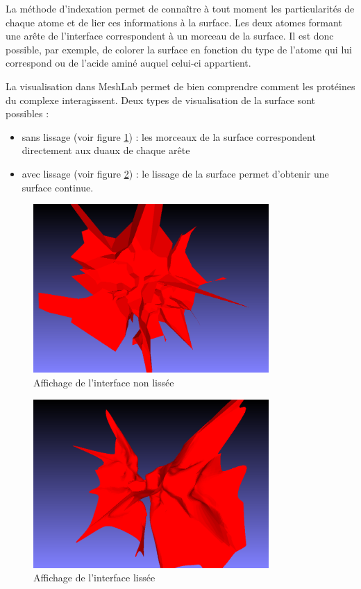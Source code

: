 La méthode d'indexation permet de connaître à tout moment les particularités de chaque
atome et de lier ces informations à la surface. Les deux atomes formant une arête
de l'interface correspondent à un morceau de la surface. Il est donc possible, par exemple,
de colorer la surface en fonction du type de l'atome qui lui correspond ou de l'acide aminé
auquel celui-ci appartient.

La visualisation dans MeshLab permet de bien comprendre comment les protéines du complexe interagissent.
Deux types de visualisation de la surface sont possibles :
\begin{itemize}
  \item sans lissage (voir figure \ref{fig::surf_no_smooth}) : les morceaux de la surface correspondent
  directement aux duaux de chaque arête
  \item avec lissage (voir figure \ref{fig::surf_smooth}) : le lissage de la surface
  permet d'obtenir une surface continue.
\end{itemize}

\begin{figure}[ht]
\centering
  \includegraphics[width=0.8\textwidth]{figures/surf_no_smooth.png}
  \caption{Affichage de l'interface non lissée}
  \label{fig::surf_no_smooth}
\end{figure}

\begin{figure}[ht]
\centering
  \includegraphics[width=0.8\textwidth]{figures/surf_smooth.png}
  \caption{Affichage de l'interface lissée}
  \label{fig::surf_smooth}
\end{figure}

